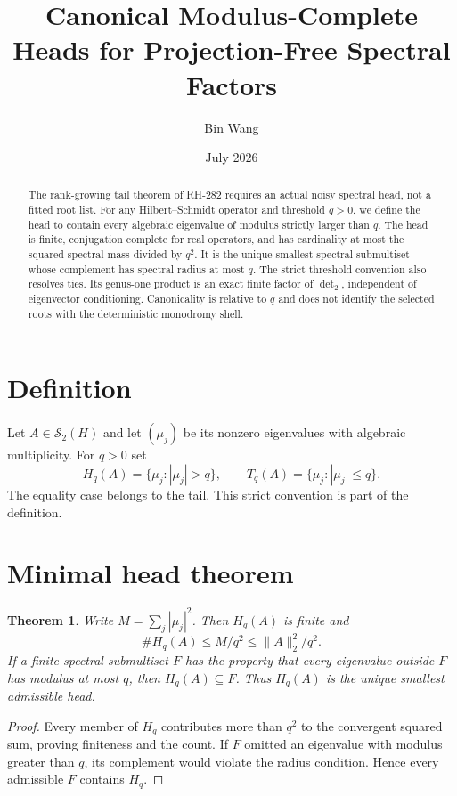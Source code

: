 \documentclass[11pt]{article}
\title{Canonical Modulus-Complete Heads for Projection-Free Spectral Factors}
\author{Bin Wang}\date{July 2026}
\newtheorem{theorem}{Theorem}[section]
\theoremstyle{remark}\newtheorem{remark}[theorem]{Remark}
\begin{document}
\maketitle
\begin{abstract}
The rank-growing tail theorem of RH-282 requires an actual noisy spectral
head, not a fitted root list.  For any Hilbert--Schmidt operator and threshold
$q>0$, we define the head to contain every algebraic eigenvalue of modulus
strictly larger than $q$.  The head is finite, conjugation complete for real
operators, and has cardinality at most the squared spectral mass divided by
$q^2$.  It is the unique smallest spectral submultiset whose complement has
spectral radius at most $q$.  The strict threshold convention also resolves
ties.  Its genus-one product is an exact finite factor of $\det_2$, independent
of eigenvector conditioning.  Canonicality is relative to $q$ and does not
identify the selected roots with the deterministic monodromy shell.
\end{abstract}

\section{Definition}
Let $A\in\mathcal S_2(H)$ and let $(\mu_j)$ be its nonzero eigenvalues with
algebraic multiplicity.  For $q>0$ set
\[
 H_q(A)=\{\mu_j:|\mu_j|>q\},\qquad
 T_q(A)=\{\mu_j:|\mu_j|\le q\}.
\]
The equality case belongs to the tail.  This strict convention is part of the
definition.

\section{Minimal head theorem}
\begin{theorem}\label{thm:head}
Write $M=\sum_j|\mu_j|^2$.  Then $H_q(A)$ is finite and
\[
 \#H_q(A)\le M/q^2\le\|A\|_2^2/q^2.
\]
If a finite spectral submultiset $F$ has the property that every eigenvalue
outside $F$ has modulus at most $q$, then $H_q(A)\subseteq F$.  Thus
$H_q(A)$ is the unique smallest admissible head.
\end{theorem}
\begin{proof}
Every member of $H_q$ contributes more than $q^2$ to the convergent squared
sum, proving finiteness and the count.  If $F$ omitted an eigenvalue with
modulus greater than $q$, its complement would violate the radius condition.
Hence every admissible $F$ contains $H_q$.
\end{proof}
\end{document}
